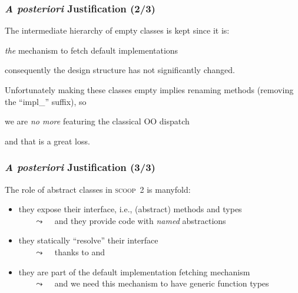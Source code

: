 \documentclass{beamer}
\newcommand{\scoop}{\textsc{scoop}\xspace}
\begin{document}
\begin{frame}
  \frametitle{\textit{A posteriori} Justification (2/3)}


  The intermediate hierarchy of empty classes is kept since it is:

  \begin{center}
    \textit{the} mechanism to fetch default implementations
  \end{center}

  consequently the design structure has not significantly
  changed.

  \bigskip\bigskip

  Unfortunately making these classes empty implies renaming methods
  (removing the ``impl\_'' suffix), so

  \begin{center}
    we are \textit{no more} featuring the classical OO dispatch
  \end{center}
  
  and that is a great loss.

\end{frame}



\begin{frame}
  \frametitle{\textit{A posteriori} Justification (3/3)}


  The role of abstract classes in \scoop~2 is manyfold:
  \medskip
  \begin{itemize}
  \item they expose their interface, i.e., (abstract) methods and types\\
    ~~~ {\scriptsize $\leadsto$ ~ and they provide code with \textit{named} abstractions }
    \smallskip
  \item they statically ``resolve'' their interface \\
    ~~~ {\scriptsize $\leadsto$ ~ thanks to {\color{mediumblue}{stc\_typename}} and {\color{darkgray}{this-$>$exact().impl\_}} }
    \smallskip
  \item they are part of the default implementation fetching mechanism \\
    ~~~ {\scriptsize $\leadsto$ ~ and we need this mechanism to have generic function types }
    \smallskip
  \end{itemize}

\end{frame}
\end{document}
